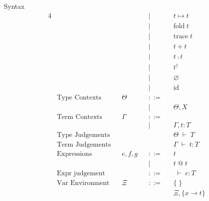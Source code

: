 \documentclass[8pt]{jsarticle}
\newcommand{\sequent}[2]{#1 \;\vdash\; #2}
\newcommand{\bnfdef}{::=}
\begin{document}
\begin{itembox}[c]{Syntax}
\begin{alignat*}{4}
    &                       &       &                &       &|       &       & t\mapsto{}t \\
    &                       &       &                &       &|       &       & \text{fold}\;t \\
    &                       &       &                &       &|       &       & \text{trace}\;t \\
    &                       &       &                &       &|       &       & t + t \\
    &                       &       &                &       &|       &       & t \fcmp t \\
    &                       &       &                &       &|       &       & t^\dagger \\
    &                       &       &                &       &|       &       & \varnothing \\
    &                       &       &                &       &|       &       & \text{id} \\    
    &\text{Type Contexts}   &       &\Theta          &       &\bnfdef &       & \\
    &                       &       &                &       &|       &       & \Theta,X\\
    &\text{Term Contexts}   &       &\Gamma          &       &\bnfdef &       & \\
    &                       &       &                &       &|       &       & \Gamma,t:T \\
    &\text{Type Judgements} &       &                &       &        &       & \sequent{\Theta}{T} \\
    &\text{Term Judgements} &       &                &       &        &       & \sequent{\Gamma}{t:T} \\
    &\text{Expressions}     &       &e,f,g           &       &\bnfdef &       & t \\
    &                       &       &                &       &|       &       & t\;\text{@}\;t \\
    &\text{Expr judgement}  &       &                &       &\bnfdef &       & \sequent{}{e:T} \\
    &\text{Var Environment} &      &\Xi              &       &\bnfdef &       & \{\;\} \\
    &                       &      &                 &       &        &       & \Xi,\{x\rightarrow{t}\} \\
  \end{alignat*}
\end{itembox}
\end{document}
